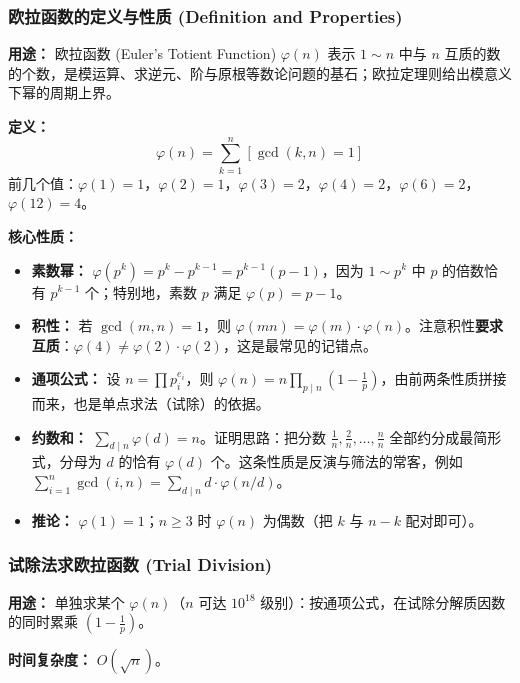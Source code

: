 \subsubsection{欧拉函数的定义与性质 (Definition and Properties)}

\textbf{用途：}
欧拉函数 (Euler's Totient Function) $\varphi(n)$ 表示 $1 \sim n$ 中与 $n$ 互质的数的个数，是模运算、求逆元、阶与原根等数论问题的基石；欧拉定理则给出模意义下幂的周期上界。

\textbf{定义：}
\[
\varphi(n) = \sum_{k=1}^{n} [\gcd(k, n) = 1]
\]
前几个值：$\varphi(1) = 1$，$\varphi(2) = 1$，$\varphi(3) = 2$，$\varphi(4) = 2$，$\varphi(6) = 2$，$\varphi(12) = 4$。

\textbf{核心性质：}
\begin{itemize}
    \item \textbf{素数幂：} $\varphi(p^{k}) = p^{k} - p^{k-1} = p^{k-1}(p-1)$，因为 $1 \sim p^{k}$ 中 $p$ 的倍数恰有 $p^{k-1}$ 个；特别地，素数 $p$ 满足 $\varphi(p) = p - 1$。
    \item \textbf{积性：} 若 $\gcd(m, n) = 1$，则 $\varphi(mn) = \varphi(m) \cdot \varphi(n)$。注意积性\textbf{要求互质}：$\varphi(4) \neq \varphi(2) \cdot \varphi(2)$，这是最常见的记错点。
    \item \textbf{通项公式：} 设 $n = \prod p_i^{e_i}$，则 $\varphi(n) = n \prod_{p \mid n} \left(1 - \frac{1}{p}\right)$，由前两条性质拼接而来，也是单点求法（试除）的依据。
    \item \textbf{约数和：} $\sum_{d \mid n} \varphi(d) = n$。证明思路：把分数 $\frac{1}{n}, \frac{2}{n}, \dots, \frac{n}{n}$ 全部约分成最简形式，分母为 $d$ 的恰有 $\varphi(d)$ 个。这条性质是反演与筛法的常客，例如 $\sum_{i=1}^{n} \gcd(i, n) = \sum_{d \mid n} d \cdot \varphi(n/d)$。
    \item \textbf{推论：} $\varphi(1) = 1$；$n \ge 3$ 时 $\varphi(n)$ 为偶数（把 $k$ 与 $n-k$ 配对即可）。
\end{itemize}

\subsubsection{试除法求欧拉函数 (Trial Division)}

\textbf{用途：}
单独求某个 $\varphi(n)$（$n$ 可达 $10^{18}$ 级别）：按通项公式，在试除分解质因数的同时累乘 $\left(1 - \frac{1}{p}\right)$。

\textbf{时间复杂度：} $O(\sqrt{n})$。



